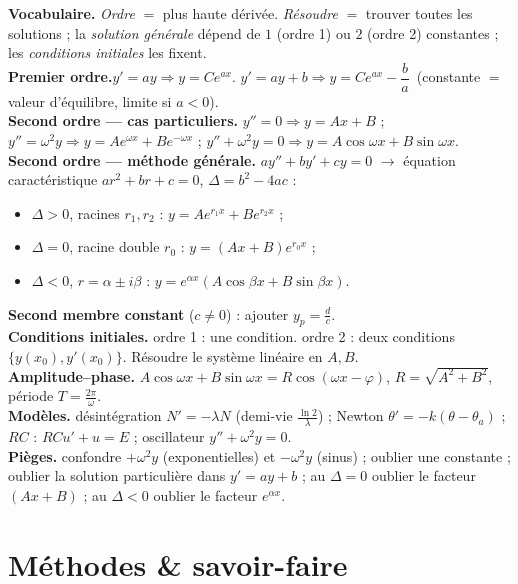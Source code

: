 \begin{synthese}
\textbf{Vocabulaire.} \emph{Ordre} $=$ plus haute dérivée. \emph{Résoudre} $=$
trouver toutes les solutions ; la \emph{solution générale} dépend de $1$ (ordre
1) ou $2$ (ordre 2) constantes ; les \emph{conditions initiales} les fixent.\\[4pt]
\textbf{Premier ordre.}\quad $y'=ay \Rightarrow y=Ce^{ax}$.\quad
$y'=ay+b \Rightarrow y=Ce^{ax}-\dfrac{b}{a}$ \,(constante $=$ valeur d'équilibre,
limite si $a<0$).\\[4pt]
\textbf{Second ordre — cas particuliers.}\quad
$y''=0\Rightarrow y=Ax+B$ ;\quad
$y''=\omega^2 y\Rightarrow y=Ae^{\omega x}+Be^{-\omega x}$ ;\quad
$y''+\omega^2 y=0\Rightarrow y=A\cos\omega x+B\sin\omega x$.\\[4pt]
\textbf{Second ordre — méthode générale.} $ay''+by'+cy=0$ $\to$ équation
caractéristique $ar^2+br+c=0$, $\Delta=b^2-4ac$ :
\begin{itemize}
\item $\Delta>0$, racines $r_1,r_2$ : $y=Ae^{r_1x}+Be^{r_2x}$ ;
\item $\Delta=0$, racine double $r_0$ : $y=(Ax+B)e^{r_0x}$ ;
\item $\Delta<0$, $r=\alpha\pm i\beta$ : $y=e^{\alpha x}(A\cos\beta x+B\sin\beta x)$.
\end{itemize}
\textbf{Second membre constant} ($c\neq0$) : ajouter $y_p=\frac{d}{c}$.\\[4pt]
\textbf{Conditions initiales.} ordre 1 : une condition. ordre 2 : deux conditions
$\{y(x_0),y'(x_0)\}$. Résoudre le système linéaire en $A,B$.\\[4pt]
\textbf{Amplitude–phase.} $A\cos\omega x+B\sin\omega x=R\cos(\omega x-\varphi)$,
$R=\sqrt{A^2+B^2}$, période $T=\frac{2\pi}{\omega}$.\\[4pt]
\textbf{Modèles.} désintégration $N'=-\lambda N$ (demi-vie $\frac{\ln2}{\lambda}$) ;
Newton $\theta'=-k(\theta-\theta_a)$ ; $RC$ : $RCu'+u=E$ ; oscillateur
$y''+\omega^2y=0$.\\[4pt]
\textbf{Pièges.} confondre $+\omega^2 y$ (exponentielles) et $-\omega^2 y$
(sinus) ; oublier une constante ; oublier la solution particulière dans
$y'=ay+b$ ; au $\Delta=0$ oublier le facteur $(Ax+B)$ ; au $\Delta<0$ oublier le
facteur $e^{\alpha x}$.
\end{synthese}

\section{Méthodes \& savoir-faire}

